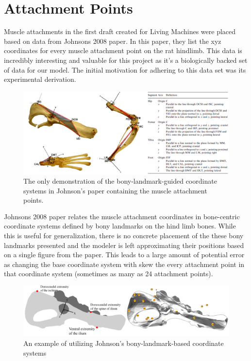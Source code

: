 \documentclass[runningheads,a4paper]{llncs}
\begin{document}
\section{Attachment Points}
	Muscle attachments in the first draft created for Living Machines were placed based on data from Johnson\textquotesingle s 2008 paper\cite{johnson_three-dimensional_2008}. In this paper, they list the xyz coordinates for every muscle attachment point on the rat hindlimb. This data is incredibly interesting and valuable for this project as it’s a biologically backed set of data for our model. The initial motivation for adhering to this data set was its experimental derivation. \par
			\begin{figure}
				\centering
				\includegraphics[width=\textwidth]{john1.PNG}
				\caption{The only demonstration of the bony-landmark-guided coordinate systems in Johnson's paper containing the muscle attachment points.}
			\end{figure}
	Johnson\textquotesingle s 2008 paper relates the muscle attachment coordinates in bone-centric coordinate systems defined by bony landmarks on the hind limb bones. While this is useful for generalization, there is no concrete placement of the these bony landmarks presented and the modeler is left approximating their positions based on a single figure from the paper. This leads to a large amount of potential error as changing the base coordinate system with skew the every attachment point in that coordinate system (sometimes as many as 24 attachment points). \par
			\begin{figure}
				\centering
				\includegraphics[width=\textwidth]{RP7.png}
				\caption{An example of utilizing Johnson's bony-landmark-based coordinate systems}
			\end{figure}
\end{document}
